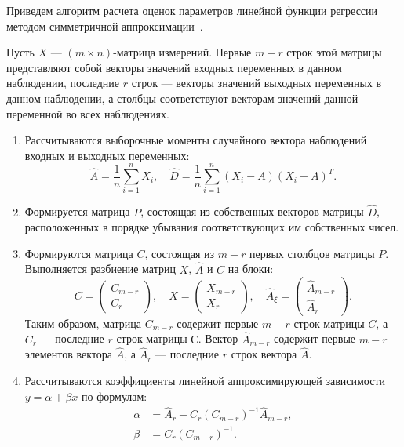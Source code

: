 Приведем алгоритм расчета оценок параметров линейной функции
регрессии методом симметричной аппроксимации~\cite{mukha_2016}.

Пусть \( X \) --- \( (m \times n) \)-матрица измерений.
Первые \( m - r \) строк этой матрицы представляют собой векторы значений входных
переменных в данном наблюдении,
последние \( r \) строк --- векторы значений выходных переменных в данном наблюдении,
а столбцы соответствуют векторам значений данной переменной во всех наблюдениях.

\begin{enumerate}
\item Рассчитываются выборочные моменты случайного вектора наблюдений входных и выходных переменных:
  \begin{equation*}
    \hat{A} = \dfrac{1}{n} \sum_{i=1}^n X_i, \quad
    \hat{D} = \dfrac{1}{n}  \sum_{i=1}^n (X_i - A) (X_i - A)^T.
  \end{equation*}
\item Формируется матрица \( P \), состоящая из собственных векторов матрицы \( \hat{D} \),
  расположенных в порядке убывания соответствующих им собственных чисел.
\item Формируются матрица \( C \), состоящая из \( m - r \) первых столбцов матрицы
  \( P \). Выполняется разбиение матриц \( X \), \( \hat{A} \) и \( C \) на блоки:
  \begin{equation*}
    C =
    \begin{pmatrix}
      C_{m-r} \\
      C_r
    \end{pmatrix}, \quad
    X =
    \begin{pmatrix}
      X_{m-r} \\
      X_r
    \end{pmatrix}, \quad
    \hat{A}_{\xi} =
    \begin{pmatrix}
      \hat{A}_{m-r} \\
      \hat{A}_r
    \end{pmatrix}.
  \end{equation*}
  Таким образом, матрица \( C_{m-r} \) содержит первые \( m - r \) строк матрицы \( C \),
  а \( C_{r} \) --- последние \( r \) строк матрицы \( С \).
  Вектор \( \hat{A}_{m-r} \) содержит первые \( m - r \) элементов вектора \( \hat{A} \),
  а \( \hat{A}_{r} \) --- последние \( r \) строк вектора \( \hat{A} \).
\item Рассчитываются коэффициенты линейной аппроксимирующей зависимости
  \( y = \alpha + \beta x \) по формулам:
  \begin{equation*}
    \begin{aligned}
      \alpha &= \hat{A}_r - C_r (C_{m-r})^{-1} \hat{A}_{m-r}, \\
      \beta &= C_r (C_{m-r})^{-1}.
    \end{aligned}
  \end{equation*}
\end{enumerate}

